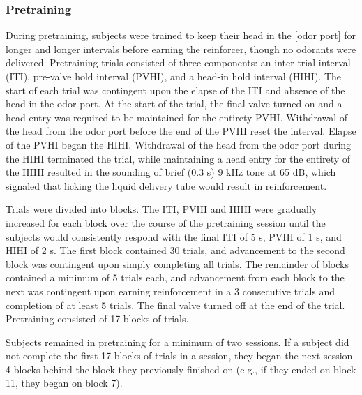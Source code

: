 \subsubsection{Pretraining}
During pretraining, subjects were trained to keep their head in the [odor port] for longer and longer intervals before earning the reinforcer, though no odorants were delivered. Pretraining trials consisted of three components: an inter trial interval (ITI), pre-valve hold interval (PVHI), and a head-in hold interval (HIHI). The start of each trial was contingent upon the elapse of the ITI and absence of the head in the odor port. At the start of the trial, the final valve turned on and a head entry was required to be maintained for the entirety PVHI. Withdrawal of the head from the odor port before the end of the PVHI reset the interval. Elapse of the PVHI began the HIHI. Withdrawal of the head from the odor port during the HIHI terminated the trial, while maintaining a head entry for the entirety of the HIHI resulted in the sounding of brief (0.3 s) 9 kHz tone at 65 dB, which signaled that licking the liquid delivery tube would result in reinforcement.

Trials were divided into blocks. The ITI, PVHI and HIHI were gradually increased for each block over the course of the pretraining session until the subjects would consistently respond with the final ITI of 5 s, PVHI of 1 s, and HIHI of 2 s.  The first block contained 30 trials, and advancement to the second block was contingent upon simply completing all trials. The remainder of blocks contained a minimum of 5 trials each, and advancement from each block to the next was contingent upon earning reinforcement in a 3 consecutive trials and completion of at least 5 trials. The final valve turned off at the end of the trial. Pretraining consisted of 17 blocks of trials.

Subjects remained in pretraining for a minimum of two sessions.  If a subject did not complete the first 17 blocks of trials in a session, they began the next session 4 blocks behind the block they previously finished on (e.g., if they ended on block 11, they began on block 7).

